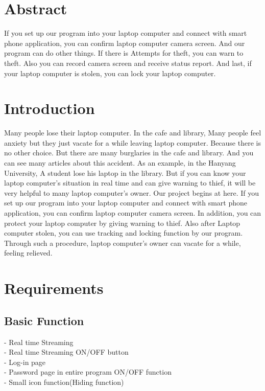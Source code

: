 \documentclass[12pt]{article}
\begin{document}
\setcounter{page}{1}
\section{Abstract}

If you set up our program into your laptop computer and connect with smart phone application, you can confirm laptop computer camera screen. And our program can do other things. If there is Attempts for theft, you can warn to theft. Also you can record camera screen and receive status report. And last, if your laptop computer is stolen, you can lock your laptop computer.\\





\section{Introduction}

Many people lose their laptop computer. In the cafe and library, Many people feel anxiety but they just vacate for a while leaving laptop computer. Because there is no other choice. But there are many burglaries in the cafe and library. And you can see many articles about this accident. As an example, in the Hanyang University, A student lose his laptop in the library. But if you can know your laptop computer’s situation in real time and can give warning to thief, it will be very helpful to many laptop computer’s owner. Our project begins at here. If you set up our program into your laptop computer and connect with smart phone application, you can confirm laptop computer camera screen. In addition, you can protect your laptop computer by giving warning to thief. Also after Laptop computer stolen, you can use tracking and locking function by our program. Through such a procedure, laptop computer’s owner can vacate for a while, feeling relieved. 

\section{Requirements}


\subsection{Basic Function}
- Real time Streaming\\
- Real time Streaming ON/OFF button\\
- Log-in page\\
- Password page in entire program ON/OFF function\\
- Small icon function(Hiding function)\\
\end{document}

